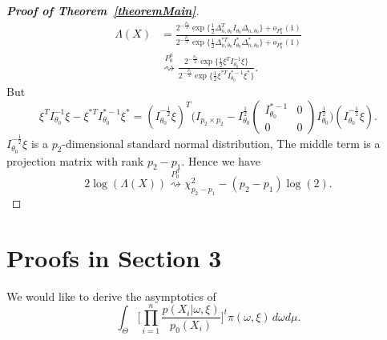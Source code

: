 \documentclass[11pt]{article}
\theoremstyle{plain}
\newtheorem{theorem}{\quad\quad Theorem}
\theoremstyle{definition}
\theoremstyle{remark}
\begin{document}
\begin{appendices}
\begin{proof}[\textbf{Proof of Theorem~\ref{theoremMain}}]
\begin{equation}\label{equationNull}
    \begin{aligned} 
        \Lambda(X)&=
        \frac{2^{-\frac{p_2}{2}}\exp\{\frac{1}{2}\Delta_{n,\theta_0}^T I_{\theta_0}\Delta_{n,\theta_0}\}+o_{P_0^n}(1)
        }{2^{-\frac{p_1}{2}}\exp\{\frac{1}{2}\Delta_{n,\theta_0}^{*T}I^*_{\theta_0}\Delta^*_{n,\theta_0}\}+o_{P_0^n}(1)
        }
        \\
        &\overset{P_{0}^n}{\rightsquigarrow }
        \frac{2^{-\frac{p_2}{2}}\exp\{\frac{1}{2}\xi^T I^{-1}_{\theta_0}\xi\}
        }{2^{-\frac{p_1}{2}}\exp\{\frac{1}{2}\xi^{*T}I^{*-1}_{\theta_0}\xi^*\}
        }.
    \end{aligned}
\end{equation}
But
\begin{equation}\label{equationXi}
    \xi^T I^{-1}_{\theta_0}\xi -\xi^{*T}I^{*-1}_{\theta_0}\xi^*
    ={(I_{\theta_0}^{-\frac{1}{2}}\xi)}^T\Big(
        I_{p_{2}\times p_{2}}-
        I_{\theta_0}^{\frac{1}{2}}
        \left(\begin{matrix} 
                I^{*-1}_{\theta_0}&0\\
                0&0
        \end{matrix}\right)
        I_{\theta_0}^{\frac{1}{2}}
    \Big)(I_{\theta_0}^{-\frac{1}{2}}\xi).
\end{equation}
    $I_{\theta_0}^{-\frac{1}{2}}\xi$ is a $p_2$-dimensional standard normal distribution, The middle term is a projection matrix with rank $p_2-p_1$. Hence we have
\begin{equation}
    2\log(\Lambda(X))\overset{P_0^n}{\rightsquigarrow} \chi^2_{p_2-p_1}-(p_2-p_1)\log(2).
\end{equation}
\end{proof}

\section{Proofs in Section 3}

We would like to derive the asymptotics of
\begin{equation}
    \int_\Theta \Big[\prod_{i=1}^n \frac{p(X_i|\omega,\xi)}{p_0(X_i)}\Big]^t \pi(\omega,\xi)\, d\omega d\mu.
    \label{temp}
\end{equation}


\end{appendices}
\end{document}
